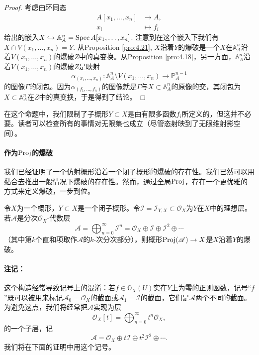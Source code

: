 \begin{proof}
	考虑由环同态
	\[
		\begin{aligned}
			A\left[x_1,\dots,x_n\right] & \longrightarrow A,\\
			x_i &\longmapsto f_i
		\end{aligned}
	\]
	给出的嵌入$X\hookrightarrow \mathbb A_A^n=\operatorname{Spec} A[x_1,\dots,x_n]$.
	注意到在这个嵌入下我们有$X\cap V(x_1,\dots,x_n)=Y$. 从Proposition \ref{pro:4.21}, $X$沿着$Y$的爆破是一个$X$在$\mathbb A_A^n$沿着$V(x_1,\dots,x_n)$的爆破$Z$中的真变换。从Proposition \ref{pro:4.18}，另一方面，$\mathbb A_A^n$沿着$V(x_1,\dots,x_n)$的爆破$Z$是映射
	\[
		\alpha_{(x_1,\dots,x_n)}:\mathbb A_A^n\setminus V(x_1,\dots,x_n)\longrightarrow \mathbb P_A^{n-1}
	\]
	的图像$\Gamma$的闭包。因为$\alpha_{(f_1,\dots,f_n)}$的图像就是$\Gamma$与$X\subset \mathbb A_A^n$的原像的交，其闭包为$X\subset \mathbb A_A^n$在$Z$中的真变换，于是得到了结论。
\end{proof}

在这个命题中，我们限制了子概形$Y\subset X$是由有限多函数$f_i$所定义的，但这并不必要。读者可以检查所有的事情对无限集也成立（尽管态射映到了无限维射影空间）。


\paragraph*{作为$\operatorname{Proj}$的爆破} 我们已经证明了一个仿射概形沿着一个闭子概形的爆破的存在性。我们已然可以用黏合去推出一般情况下爆破的存在性。然而，通过全局$\operatorname{Proj}$，存在一个更优雅的方式来定义爆破，一步到位。

\begin{thm}\label{thm:4.23}
	令$X$为一个概形，$Y\subset X$是一个闭子概形。令$\mathscr I=\mathscr I_{Y,X}\subset \mathscr O_X$为$Y$在$X$中的理想层。若$\mathscr A$是分次$\mathscr O_X$-代数层
	\[
	\mathscr A=\bigoplus_{n=0}^\infty \mathscr I^n=\mathscr O_X\oplus \mathscr I\oplus \mathscr I^2\oplus \cdots
	\]
	（其中第$k$个直和项取作$\mathscr A$的$k$-次分次部分），则概形$\operatorname{Proj}(\mathscr A)\to X$是$X$沿着$Y$的爆破。
\end{thm}

\paragraph*{注记：}这个构造经常导致记号上的混淆：若$f\in \mathbb O_X(U)$实在$Y$上为零的正则函数，记号``$f$''既可以被用来标记$\mathscr A_0=\mathscr O_X$的截面或$\mathscr A_1=\mathscr I$的截面，它们是$\mathscr A$两个不同的截面。为避免这点，我们将经常把$\mathscr A$实现为层
\[
	\mathscr O_X[t]=\bigoplus_{n=0}^\infty t^n\mathscr O_X,
\]
的一个子层，记
\[
	\mathscr A=\mathscr O_X\oplus t\mathscr I\oplus t^2\mathscr I^2\oplus \cdots.
\]
我们将在下面的证明中用这个记号。


